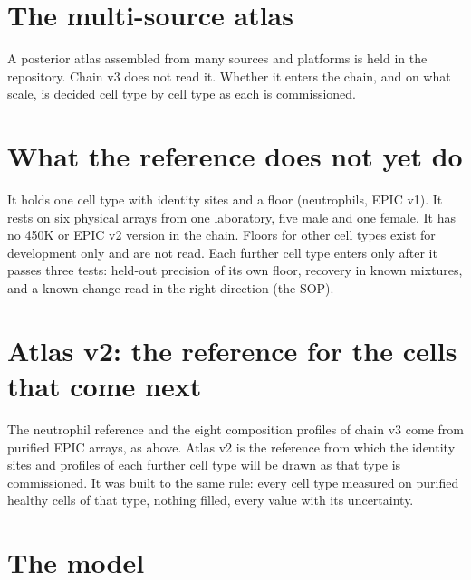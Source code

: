 \section{The multi-source atlas}

A posterior atlas assembled from many sources and platforms is held in the repository.
Chain v3 does not read it. Whether it enters the chain, and on what scale, is decided cell type by cell type as each is commissioned. \openprob

\section{What the reference does not yet do}

It holds one cell type with identity sites and a floor (neutrophils, EPIC v1). It rests on six physical arrays from one laboratory, five male and one
female. It has no 450K or EPIC v2 version in the chain. Floors for other cell types exist for development only and are not read. Each further cell type enters only after it passes three tests:
held-out precision of its own floor, recovery in known mixtures, and a known change read in the right direction (the SOP). \openprob

\section{Atlas v2: the reference for the cells that come next}

The neutrophil reference and the eight composition profiles of chain v3 come from purified EPIC arrays, as above. Atlas v2
is the reference from which the identity sites and profiles of each further cell type will be drawn as that type is commissioned. It was built
to the same rule: every cell type measured on purified healthy cells of that type, nothing filled, every value with its uncertainty.

\section{The model}

